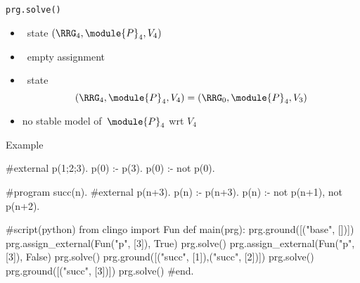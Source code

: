 \begin{frame}{\texttt{prg.solve()}}
  \begin{itemize}
  \item {} \clingo\ state $(\boldsymbol{\RRG}_4,\module{P}_4,V_4 )$
  \item {} \ empty assignment
    \medskip
  \item<2->  \clingo\ state
    \[
      (\boldsymbol{\RRG}_4,\module{P}_4,V_4 )
    = (\boldsymbol{\RRG}_0,\module{P}_4,V_3 )
    \]
  \item<3-> no stable model of~$\module{P}_4$ wrt $V_4$
  \end{itemize}
\end{frame}
\begin{frame}[fragile]{Example}
\scriptsize\vspace{-10pt}%
\begin{semiverbatim}
   #external p(1;2;3).
   p(0) :- p(3).
   p(0) :- not p(0).

   #program succ(n).
   #external p(n+3).
   p(n) :- p(n+3).
   p(n) :- not p(n+1), not p(n+2).

   #script(python)
   from clingo import Fun
   def main(prg):
       prg.ground([("base", [])])
       prg.assign_external(Fun("p", [3]), True)
       prg.solve()
       prg.assign_external(Fun("p", [3]), False)
       prg.solve()
       prg.ground([("succ", [1]),("succ", [2])])
\only<1>{\alert{>>}}\only<2>{  }     \alert<1>{prg.solve()}
     \alert<2>{prg.ground([("succ", [3])])}
       prg.solve()
   #end.
\end{semiverbatim}
\end{frame}
